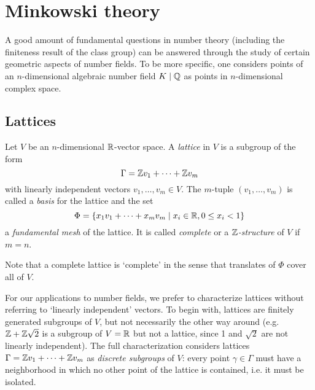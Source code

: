 \section{Minkowski theory}

A good amount of fundamental questions in number theory (including the finiteness result of the class group) can be answered through the study of certain geometric aspects of number fields. To be more specific, one considers points of an $n$-dimensional algebraic number field $K\mid\mathbb{Q}$ as points in $n$-dimensional complex space.

\subsection{Lattices}

\begin{defn}
	Let $V$ be an $n$-dimensional $\mathbb{R}$-vector space. A \emph{lattice} in $V$ is a subgroup of the form
	\[
		\Gamma = \mathbb{Z} v_1 + \cdots + \mathbb{Z} v_m
	\]
	with linearly independent vectors $v_1,\dots,v_m\in V$. The $m$-tuple $(v_1,\dots,v_m)$ is called a \emph{basis} for the lattice and the set
	\[
		\Phi = \{x_1v_1 + \cdots + x_mv_m \mid x_i\in\mathbb{R}, 0\leq x_i< 1\}
	\]
	a \emph{fundamental mesh} of the lattice. It is called \emph{complete} or a \emph{$\mathbb{Z}$-structure} of $V$ if $m=n$.
\end{defn}

Note that a complete lattice is `complete' in the sense that translates of $\Phi$ cover all of $V$.

For our applications to number fields, we prefer to characterize lattices without referring to `linearly independent' vectors. To begin with, lattices are finitely generated subgroups of $V$, but not necessarily the other way around (e.g. $\mathbb{Z}+\mathbb{Z}\sqrt{2}$ is a subgroup of $V=\mathbb{R}$ but not a lattice, since 1 and $\sqrt{2}$ are not linearly independent). The full characterization considers lattices $\Gamma=\mathbb{Z} v_1 + \cdots + \mathbb{Z} v_m$ as \emph{discrete subgroups} of $V$: every point $\gamma\in\Gamma$ must have a neighborhood in which no other point of the lattice is contained, i.e. it must be isolated.

